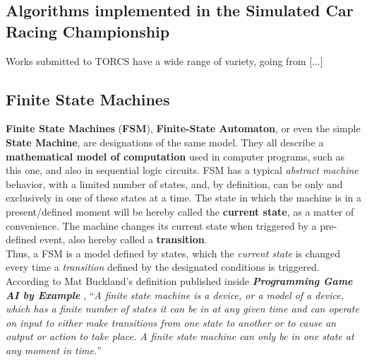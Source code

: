 	\subsection{Algorithms implemented in the Simulated Car Racing Championship}
	
	Works submitted to TORCS have a wide range of variety, going from [...]


	\subsection{Finite State Machines}
	
	\textbf{Finite State Machines} (\textbf{FSM}), \textbf{Finite-State Automaton}, or even the simple \textbf{State Machine},
	are designations of the same model. They all describe a \textbf{mathematical model of computation} used in computer 
	programs, such as this one, and also in sequential logic circuits. FSM has a typical \textit{abstract machine} behavior,
	with a limited number of states, and, by definition, can be only and exclusively in one of these states at a time. The 
	state in which the machine is in a present/defined moment will be hereby called the \textbf{current state}, as a matter
	of convenience. The machine changes its current state when triggered by a pre-defined event, also hereby called a 
	\textbf{transition}.\\
	
	Thus, a FSM is a model defined by states, which the \textit{current state} is changed every time a \textit{transition}
	defined by the designated conditions is triggered. According to Mat Buckland's definition published inside 
	\textbf{\emph{Programming Game AI by Example}} \cite{buckland2005}, ``\emph{A finite state machine is a device, or a model
	of a device, which has a finite number of states it can be in at any given time and can operate on	input to either 
	make transitions from one state to another or to cause an output or action to take place. A finite state machine can
	only be in one	state at any moment in time.}''\\[0.2cm]
